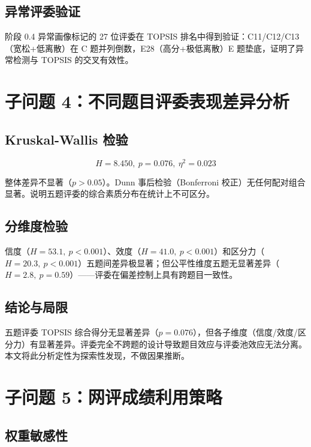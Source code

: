 \documentclass[UTF8]{ctexart}
\begin{document}
\subsection{异常评委验证}

阶段 0.4 异常画像标记的 27 位评委在 TOPSIS 排名中得到验证：C11/C12/C13（宽松+低离散）在 C 题并列倒数，E28（高分+极低离散）E 题垫底，证明了异常检测与 TOPSIS 的交叉有效性。

\section{子问题 4：不同题目评委表现差异分析}

\subsection{Kruskal-Wallis 检验}

\begin{equation}
H = 8.450,\ p = 0.076,\ \eta^2 = 0.023
\end{equation}

整体差异不显著（$p > 0.05$）。Dunn 事后检验（Bonferroni 校正）无任何配对组合显著。说明五题评委的综合素质分布在统计上不可区分。

\subsection{分维度检验}

信度（$H=53.1,\ p<0.001$）、效度（$H=41.0,\ p<0.001$）和区分力（$H=20.3,\ p<0.001$）五题间差异极显著；但公平性维度五题无显著差异（$H=2.8,\ p=0.59$）——评委在偏差控制上具有跨题目一致性。

\subsection{结论与局限}

五题评委 TOPSIS 综合得分无显著差异（$p=0.076$），但各子维度（信度/效度/区分力）有显著差异。评委完全不跨题的设计导致题目效应与评委池效应无法分离。本文将此分析定性为探索性发现，不做因果推断。

\section{子问题 5：网评成绩利用策略}

\subsection{权重敏感性}
\end{document}
